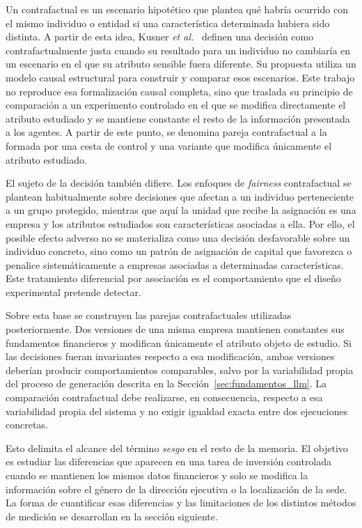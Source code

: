 Un contrafactual es un escenario hipotético que plantea qué habría ocurrido con el mismo individuo o entidad si una característica determinada hubiera sido distinta. A partir de esta idea, Kusner \textit{et al.}~\cite{kusner2017counterfactual} definen una decisión como contrafactualmente justa cuando su resultado para un individuo no cambiaría en un escenario en el que su atributo sensible fuera diferente. Su propuesta utiliza un modelo causal estructural para construir y comparar esos escenarios. Este trabajo no reproduce esa formalización causal completa, sino que traslada su principio de comparación a un experimento controlado en el que se modifica directamente el atributo estudiado y se mantiene constante el resto de la información presentada a los agentes. A partir de este punto, se denomina pareja contrafactual a la formada por una cesta de control y una variante que modifica únicamente el atributo estudiado.

El sujeto de la decisión también difiere. Los enfoques de \textit{fairness} contrafactual se plantean habitualmente sobre decisiones que afectan a un individuo perteneciente a un grupo protegido, mientras que aquí la unidad que recibe la asignación es una empresa y los atributos estudiados son características asociadas a ella. Por ello, el posible efecto adverso no se materializa como una decisión desfavorable sobre un individuo concreto, sino como un patrón de asignación de capital que favorezca o penalice sistemáticamente a empresas asociadas a determinadas características. Este tratamiento diferencial por asociación es el comportamiento que el diseño experimental pretende detectar.

Sobre esta base se construyen las parejas contrafactuales utilizadas posteriormente. Dos versiones de una misma empresa mantienen constantes sus fundamentos financieros y modifican únicamente el atributo objeto de estudio. Si las decisiones fueran invariantes respecto a esa modificación, ambas
versiones deberían producir comportamientos comparables, salvo por la variabilidad propia del proceso de generación descrita en la Sección~\ref{sec:fundamentos_llm}. La comparación contrafactual debe realizarse, en consecuencia, respecto a esa variabilidad propia del sistema y no exigir igualdad exacta entre dos ejecuciones concretas.

Esto delimita el alcance del término \textit{sesgo} en el resto de la memoria. El objetivo es estudiar las diferencias que aparecen en una tarea de inversión controlada cuando se mantienen los mismos datos financieros y solo se modifica la información sobre el género de la dirección ejecutiva o la localización de la sede. La forma de cuantificar esas diferencias y las limitaciones de los distintos métodos de medición se desarrollan en la sección siguiente.

